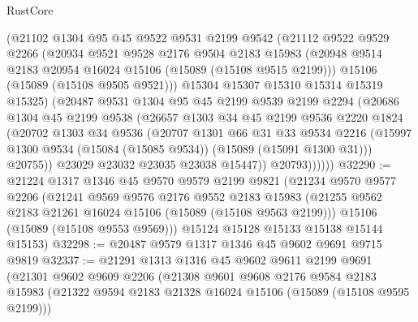 \begin{lexlean}{RustCore}
\begin{coremodule}
            (@21102
              @1304
              @95
              @45
              @9522
              @9531
              @2199
              @9542
              (@21112
                @9522
                @9529
                @2266
                (@20934
                  @9521
                  @9528
                  @2176
                  @9504
                  @2183
                  @15983
                  (@20948 @9514 @2183 @20954 @16024 @15106 (@15089 (@15108 @9515 @2199)))
                  @15106
                  (@15089 (@15108 @9505 @9521)))
                @15304
                @15307
                @15310
                @15314
                @15319
                @15325)
              (@20487
                @9531
                @1304
                @95
                @45
                @2199
                @9539
                @2199
                @2294
                (@20686
                  @1304
                  @45
                  @2199
                  @9538
                  (@26657
                    @1303
                    @34
                    @45
                    @2199
                    @9536
                    @2220
                    @1824
                    (@20702
                      @1303
                      @34
                      @9536
                      (@20707
                        @1301
                        @66
                        @31
                        @33
                        @9534
                        @2216
                        (@15997 @1300 @9534 (@15084 (@15085 @9534)) (@15089 (@15091 @1300 @31)))
                        @20755))
                    @23029
                    @23032
                    @23035
                    @23038
                    @15447))
                @20793))))))
@32290 := @21224
    @1317
    @1346
    @45
    @9570
    @9579
    @2199
    @9821
    (@21234
      @9570
      @9577
      @2206
      (@21241
        @9569
        @9576
        @2176
        @9552
        @2183
        @15983
        (@21255 @9562 @2183 @21261 @16024 @15106 (@15089 (@15108 @9563 @2199)))
        @15106
        (@15089 (@15108 @9553 @9569)))
      @15124
      @15128
      @15133
      @15138
      @15144
      @15153)
@32298 := @20487 @9579 @1317 @1346 @45 @9602 @9691 @9715 @9819
@32337 := @21291
    @1313
    @1316
    @45
    @9602
    @9611
    @2199
    @9691
    (@21301
      @9602
      @9609
      @2206
      (@21308
        @9601
        @9608
        @2176
        @9584
        @2183
        @15983
        (@21322 @9594 @2183 @21328 @16024 @15106 (@15089 (@15108 @9595 @2199)))

\end{coremodule}
\end{lexlean}
